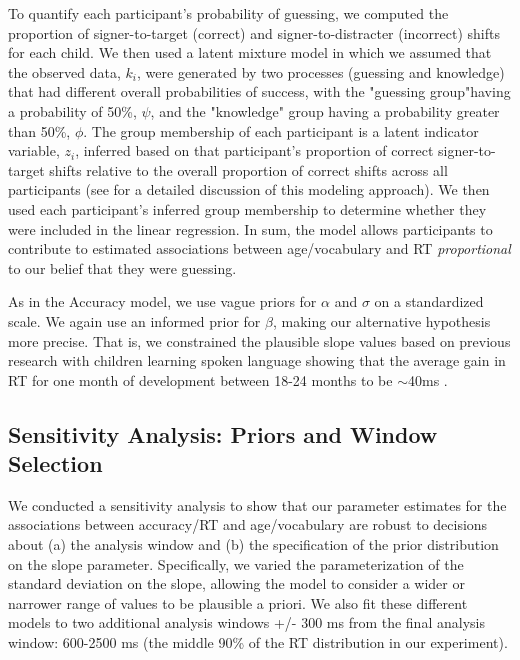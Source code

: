 \documentclass[a4paper]{article}
\begin{document}
To quantify each participant's probability of guessing, we computed the proportion of signer-to-target (correct) and signer-to-distracter (incorrect) shifts for each child. We then used a latent mixture model in which we assumed that the observed data, $k_i$, were generated by two processes (guessing and knowledge) that had different overall probabilities of success, with the "guessing group"having a probability of 50\%, $\psi$, and the "knowledge" group having a probability greater than 50\%, $\phi$. The group membership of each participant is a latent indicator variable, $z_i$, inferred based on that participant's proportion of correct signer-to-target shifts relative to the overall proportion of correct shifts across all participants (see  for a detailed discussion of this modeling approach). We then used each participant's inferred group membership to determine whether they were included in the linear regression. In sum, the model allows participants to contribute to estimated associations between age/vocabulary and RT \textit{proportional} to our belief that they were guessing. 

As in the Accuracy model, we use vague priors for $\alpha$ and $\sigma$ on a standardized scale. We again use an informed prior for $\beta$, making our alternative hypothesis more precise. That is, we constrained the plausible slope values based on previous research with children learning spoken language showing that the average gain in RT for one month of development between 18-24 months to be $\sim$40ms \cite{fernald2008looking}. 

\subsection{Sensitivity Analysis: Priors and Window Selection}

We conducted a sensitivity analysis to show that our parameter estimates for the associations between accuracy/RT and age/vocabulary are robust to decisions about (a) the analysis window and (b) the specification of the prior distribution on the slope parameter. Specifically, we varied the parameterization of the standard deviation on the slope, allowing the model to consider a wider or narrower range of values to be plausible a priori. We also fit these different models to two additional analysis windows +/- 300 ms from the final analysis window: 600-2500 ms (the middle 90\% of the RT distribution in our experiment).
\end{document}
